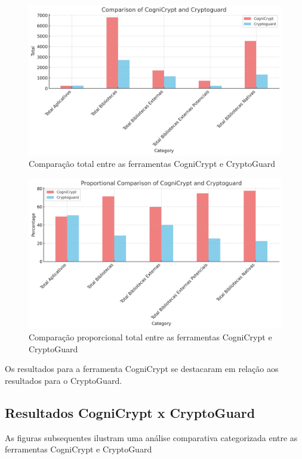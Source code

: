 \begin{figure}[!ht]
  \centering
  \includegraphics[scale=0.7]{img/plot_cc_x_cg_summary.png}
  \caption{Comparação total entre as ferramentas CogniCrypt e CryptoGuard}
  \label{img: CCvsCG_Summary}
\end{figure}

\begin{figure}[!ht]
  \centering
  \includegraphics[scale=0.7]{img/plot_cc_x_cg_proportion_summary.png}
  \caption{Comparação proporcional total entre as ferramentas CogniCrypt e CryptoGuard}
  \label{img: CCvsCG_Summary}
\end{figure}

Os resultados para a ferramenta CogniCrypt se destacaram em relação aos resultados para o CryptoGuard. 

\subsection{Resultados CogniCrypt x CryptoGuard}

As figuras subsequentes ilustram uma análise comparativa categorizada entre as ferramentas CogniCrypt e CryptoGuard


